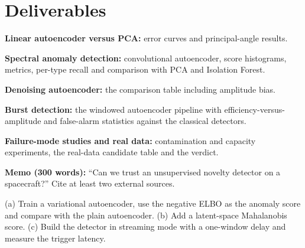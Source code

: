 \documentclass[11pt,a4paper]{article}
\begin{document}
\section*{Deliverables}
\begin{delivs}
  \item[D1] \textbf{Linear autoencoder versus PCA:} error curves and principal-angle results.
  \item[D2] \textbf{Spectral anomaly detection:} convolutional autoencoder, score histograms, metrics, per-type recall and comparison with PCA and Isolation Forest.
  \item[D3] \textbf{Denoising autoencoder:} the comparison table including amplitude bias.
  \item[D4] \textbf{Burst detection:} the windowed autoencoder pipeline with efficiency-versus-amplitude and false-alarm statistics against the classical detectors.
  \item[D5] \textbf{Failure-mode studies and real data:} contamination and capacity experiments, the real-data candidate table and the verdict.
  \item[D6] \textbf{Memo (300 words):} ``Can we trust an unsupervised novelty detector on a spacecraft?'' Cite at least two external sources.
  \item[Bonus] (a) Train a variational autoencoder, use the negative ELBO as the anomaly score and compare with the plain autoencoder. (b) Add a latent-space Mahalanobis score. (c) Build the detector in streaming mode with a one-window delay and measure the trigger latency.
\end{delivs}
\end{document}
